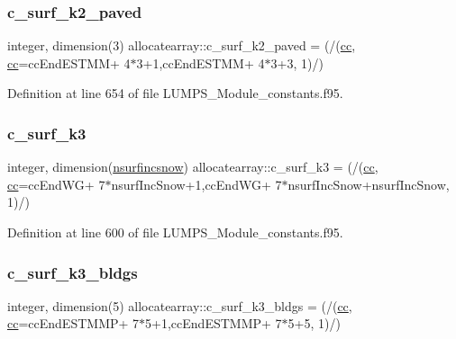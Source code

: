 \subsubsection{\texorpdfstring{c\+\_\+surf\+\_\+k2\+\_\+paved}{c\_surf\_k2\_paved}}
{\footnotesize\ttfamily integer, dimension(3) allocatearray\+::c\+\_\+surf\+\_\+k2\+\_\+paved = (/(\hyperlink{namespaceallocatearray_ac863c81704eb507dee10f5e10741e10c}{cc}, \hyperlink{namespaceallocatearray_ac863c81704eb507dee10f5e10741e10c}{cc}=cc\+End\+E\+S\+T\+MM+ 4$\ast$3+1,cc\+End\+E\+S\+T\+MM+ 4$\ast$3+3, 1)/)}



Definition at line 654 of file L\+U\+M\+P\+S\+\_\+\+Module\+\_\+constants.\+f95.

\mbox{\label{namespaceallocatearray_abd4d53cdda7a49efd6e747ac3c599869}} 
\subsubsection{\texorpdfstring{c\+\_\+surf\+\_\+k3}{c\_surf\_k3}}
{\footnotesize\ttfamily integer, dimension(\hyperlink{namespaceallocatearray_af4d113f332b6759cfa22271140c9162d}{nsurfincsnow}) allocatearray\+::c\+\_\+surf\+\_\+k3 = (/(\hyperlink{namespaceallocatearray_ac863c81704eb507dee10f5e10741e10c}{cc}, \hyperlink{namespaceallocatearray_ac863c81704eb507dee10f5e10741e10c}{cc}=cc\+End\+WG+ 7$\ast$nsurf\+Inc\+Snow+1,cc\+End\+WG+ 7$\ast$nsurf\+Inc\+Snow+nsurf\+Inc\+Snow, 1)/)}



Definition at line 600 of file L\+U\+M\+P\+S\+\_\+\+Module\+\_\+constants.\+f95.

\mbox{\label{namespaceallocatearray_a0dde0883f6fd035daedd64579708e13d}} 
\subsubsection{\texorpdfstring{c\+\_\+surf\+\_\+k3\+\_\+bldgs}{c\_surf\_k3\_bldgs}}
{\footnotesize\ttfamily integer, dimension(5) allocatearray\+::c\+\_\+surf\+\_\+k3\+\_\+bldgs = (/(\hyperlink{namespaceallocatearray_ac863c81704eb507dee10f5e10741e10c}{cc}, \hyperlink{namespaceallocatearray_ac863c81704eb507dee10f5e10741e10c}{cc}=cc\+End\+E\+S\+T\+M\+MP+ 7$\ast$5+1,cc\+End\+E\+S\+T\+M\+MP+ 7$\ast$5+5, 1)/)}



